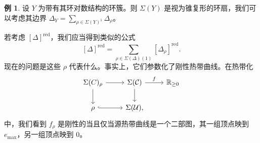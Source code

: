 \documentclass{amsart}
\theoremstyle{definition}
\newtheorem{exm}[thm]{例}
\theoremstyle{remark}
\theoremstyle{plain}
\theoremstyle{definition}
\theoremstyle{remark}
\newcommand{\R}{\mathbb{R}}
\newcommand{\mc}[1]{\mathcal{#1}}
\newcommand{\on}[1]{\operatorname{#1}}
\newcommand{\1}{\mathbf{1}}
\newcommand{\2}{\mathbf{2}}
\newcommand{\3}{\mathbf{3}}
\begin{document}
\begin{exm}
    设 \(Y\) 为带有其环对数结构的环簇。则 \(\Sigma(Y)\) 是视为锥复形的环扇，我们可以考虑其边界 \(\Delta_Y = \sum_{\rho \in \Sigma(Y)^1} \Delta_{\rho}\)。 
\end{exm}

若考虑 \([\Delta]^{\on{red}}\)，我们应当得到类似的公式
\[ [\Delta]^{\on{red}} = \sum_{\rho \in \Sigma(\Delta)(1)} [\Delta_{\rho}]^{\on{red}}. \]
现在的问题是这些 \(\rho\) 代表什么。事实上，它们参数化了刚性热带曲线。在热带化
\begin{equation*}
\begin{tikzcd}
    \Sigma(C)_{\rho} \ar{d} \ar{r} & \Sigma(\mc{C}) \ar{r}{f} \ar{d} & \R_{\geq 0} \\
    \rho \ar[hookrightarrow]{r} & \Sigma(\mc{U}),
\end{tikzcd}
\end{equation*}
中，我们看到 \(f_{\rho}\) 是刚性的当且仅当源热带曲线是一个二部图，其一组顶点映到 \(e_{\max}\)，另一组顶点映到 \(0\)。
\end{document}
